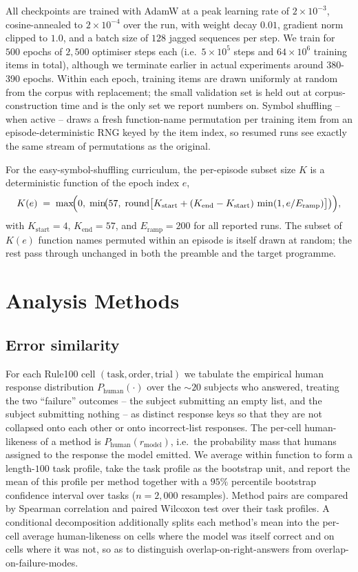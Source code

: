 \documentclass[12pt]{article}
\begin{document}
All checkpoints are trained with AdamW \citep{loshchilov2019adamw} at a peak learning rate of $2{\times}10^{-3}$, cosine-annealed to $2{\times}10^{-4}$ over the run, with weight decay $0.01$, gradient norm clipped to $1.0$, and a batch size of $128$ jagged sequences per step. We train for $500$ epochs of $2{,}500$ optimiser steps each (i.e.\ $5{\times}10^{5}$ steps and $64{\times}10^{6}$ training items in total), although we terminate earlier in actual experiments around 380-390 epochs. Within each epoch, training items are drawn uniformly at random from the corpus with replacement; the small validation set is held out at corpus-construction time and is the only set we report numbers on. Symbol shuffling -- when active -- draws a fresh function-name permutation per training item from an episode-deterministic RNG keyed by the item index, so resumed runs see exactly the same stream of permutations as the original.

For the easy-symbol-shuffling curriculum, the per-episode subset size $K$ is a deterministic function of the epoch index $e$,
\[
  K(e) \;=\; \max\!\Bigl(0,\;\min\!\bigl(57,\;\mathrm{round}\bigl[K_{\mathrm{start}} + (K_{\mathrm{end}} - K_{\mathrm{start}})\,\min(1, e / E_{\mathrm{ramp}})\bigr]\bigr)\Bigr),
\]
with $K_{\mathrm{start}} = 4$, $K_{\mathrm{end}} = 57$, and $E_{\mathrm{ramp}} = 200$ for all reported runs. The subset of $K(e)$ function names permuted within an episode is itself drawn at random; the rest pass through unchanged in both the preamble and the target programme.

\section{Analysis Methods}
\label{app:analysis}

\subsection{Error similarity}

For each Rule100 cell $(\mathrm{task}, \mathrm{order}, \mathrm{trial})$ we tabulate the empirical human response distribution $P_{\mathrm{human}}(\cdot)$ over the $\sim$$20$ subjects who answered, treating the two ``failure'' outcomes -- the subject submitting an empty list, and the subject submitting nothing -- as distinct response keys so that they are not collapsed onto each other or onto incorrect-list responses. The per-cell human-likeness of a method is $P_{\mathrm{human}}(r_{\mathrm{model}})$, i.e.\ the probability mass that humans assigned to the response the model emitted. We average within function to form a length-$100$ task profile, take the task profile as the bootstrap unit, and report the mean of this profile per method together with a $95\%$ percentile bootstrap confidence interval over tasks ($n = 2{,}000$ resamples). Method pairs are compared by Spearman correlation and paired Wilcoxon test over their task profiles. A conditional decomposition additionally splits each method's mean into the per-cell average human-likeness on cells where the model was itself correct and on cells where it was not, so as to distinguish overlap-on-right-answers from overlap-on-failure-modes.
\end{document}

